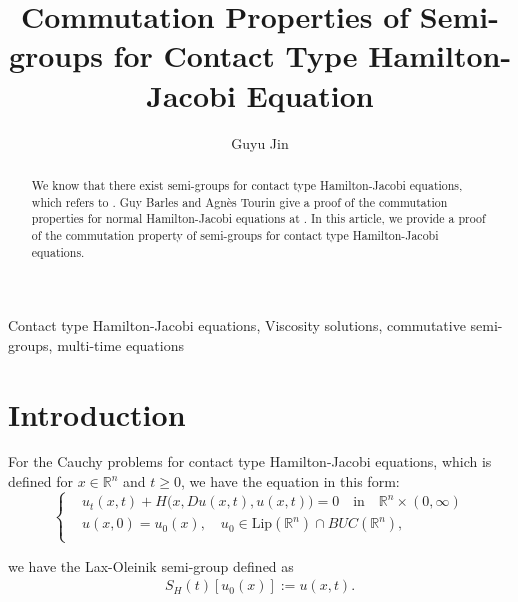 \documentclass[preprint]{elsarticle}
\numberwithin{equation}{section}
\begin{document}
\baselineskip=15pt

\begin{frontmatter}   %

\title{Commutation Properties of Semi-groups for Contact Type Hamilton-Jacobi Equation}

\author{Guyu Jin}
\address{Graduate School of Mathematical Sciences, The University of Tokyo, 3 Chome-8-1 Komaba, Meguro City, Tokyo 153-8902, Japan}


\begin{abstract}
We know that there exist semi-groups for contact type Hamilton-Jacobi equations, which refers to \cite{KLJ2}. Guy Barles and Agnès Tourin give a proof of the commutation properties for normal Hamilton-Jacobi equations at \cite{GA}. In this article, we provide a proof of the commutation property of semi-groups for contact type Hamilton-Jacobi equations.
\end{abstract}

\begin{keyword}
Contact type Hamilton-Jacobi equations, Viscosity solutions, commutative semi-groups, multi-time equations  %
\end{keyword}

\end{frontmatter}




\section{Introduction}

For the Cauchy problems for contact type Hamilton-Jacobi equations, which is defined for $x \in \mathbb{R}^n$ and $t \geq 0$, we have the equation in this form:
\begin{equation}\label{HJ}\tag{HJ}
 \left\{
   \begin{aligned}
   & u_t(x,t)+H\Big(x,Du(x,t),u(x,t)\Big)=0\quad \textrm{in}\quad \mathbb R^n\times(0,\infty)
   \\
   &u(x,0)=u_0(x),\quad u_0\in \text{Lip}(\mathbb R^n)\cap BUC(\mathbb R^n),
   \\
   \end{aligned}
   \right.
\end{equation}

we have the Lax-Oleinik semi-group defined as
\begin{align}
    S_H(t) [u_0(x)]:=u(x,t).
\end{align}
\end{document}
